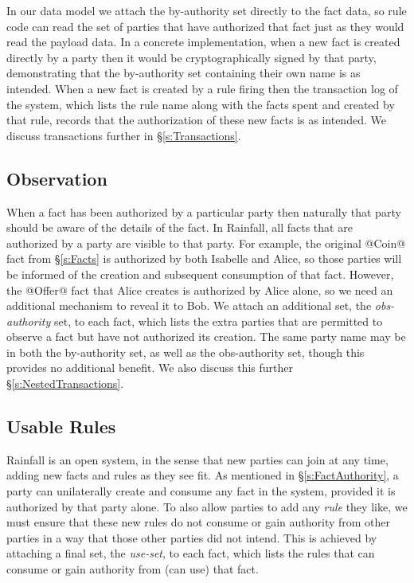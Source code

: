 In our data model we attach the by-authority set directly to the fact data, so rule code can read the set of parties that have authorized that fact just as they would read the payload data. In a concrete implementation, when a new fact is created directly by a party then it would be cryptographically signed by that party, demonstrating that the by-authority set containing their own name is as intended. When a new fact is created by a rule firing then the transaction log of the system, which lists the rule name along with the facts spent and created by that rule, records that the authorization of these new facts is as intended. We discuss transactions further in \S\ref{s:Transactions}.


\subsection{Observation}
\label{s:Observation}
When a fact has been authorized by a particular party then naturally that party should be aware of the details of the fact. In Rainfall, all facts that are authorized by a party are visible to that party. For example, the original @Coin@ fact from \S\ref{s:Facts} is authorized by both Isabelle and Alice, so those parties will be informed of the creation and subsequent consumption of that fact. However, the @Offer@ fact that Alice creates is authorized by Alice alone, so we need an additional mechanism to reveal it to Bob. We attach an additional set, the \emph{obs-authority} set, to each fact, which lists the extra parties that are permitted to observe a fact but have not authorized its creation. The same party name may be in both the by-authority set, as well as the obs-authority set, though this provides no additional benefit. We also discuss this further \S\ref{s:NestedTransactions}.



\subsection{Usable Rules}
Rainfall is an open system, in the sense that new parties can join at any time, adding new facts and rules as they see fit. As mentioned in \S\ref{s:FactAuthority}, a party can unilaterally create and consume any fact in the system, provided it is authorized by that party alone. To also allow parties to  add any \emph{rule} they like, we must ensure that these new rules do not consume or gain authority from other parties in a way that those other parties did not intend. This is achieved by attaching a final set, the \emph{use-set}, to each fact, which lists the rules that can consume or gain authority from (can use) that fact.


